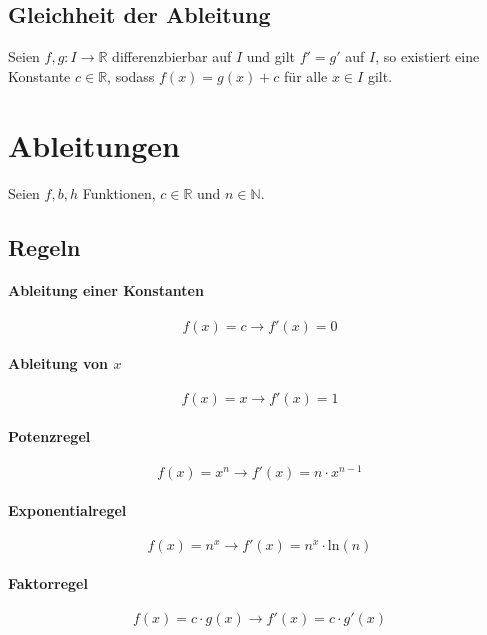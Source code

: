 \documentclass[a4paper, 11pt, accentcolor = tud3b]{tudreport}
\begin{document}
            \subsection{Gleichheit der Ableitung}
                Seien $ f, g : I \rightarrow \mathbb{R} $ differenzbierbar auf $ I $ und gilt $ f' = g' $ auf $ I $, so existiert eine Konstante $ c \in \mathbb{R} $, sodass $ f(x) = g(x) + c $ für alle $ x \in I $ gilt.

        \section{Ableitungen}
            Seien $ f, b, h $ Funktionen, $ c \in \mathbb{R} $ und $ n \in \mathbb{N} $.

            \subsection{Regeln}
                \paragraph{Ableitung einer Konstanten}
                    \[ f(x) = c \rightarrow f'(x) = 0 \]

                \paragraph{Ableitung von $ x $}
                    \[ f(x) = x \rightarrow f'(x) = 1 \]

                \paragraph{Potenzregel}
                    \[ f(x) = x ^ n \rightarrow f'(x) = n \cdot x ^ { n - 1 } \]

                \paragraph{Exponentialregel}
                    \[ f(x) = n ^ x \rightarrow f'(x) = n ^ x \cdot \text{ln}(n) \]

                \paragraph{Faktorregel}
                    \[ f(x) = c \cdot g(x) \rightarrow f'(x) = c \cdot g'(x) \]
\end{document}
